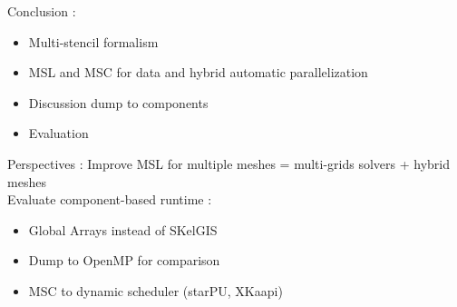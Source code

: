 Conclusion :
\begin{itemize}
\item Multi-stencil formalism
\item MSL and MSC for data and hybrid automatic parallelization
\item Discussion dump to components
\item Evaluation
\end{itemize}

Perspectives :
Improve MSL for multiple meshes = multi-grids solvers + hybrid meshes\\
Evaluate component-based runtime :
\begin{itemize}
\item Global Arrays instead of SKelGIS
\item Dump to OpenMP for comparison
\item MSC to dynamic scheduler (starPU, XKaapi)
\end{itemize}